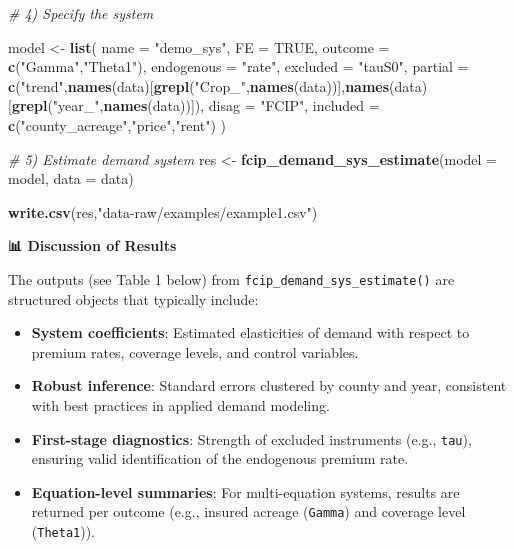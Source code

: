 \documentclass[
]{article}
\newenvironment{Shaded}{\begin{snugshade}}{\end{snugshade}}
\newcommand{\AttributeTok}[1]{\textcolor[rgb]{0.13,0.29,0.53}{#1}}
\newcommand{\CommentTok}[1]{\textcolor[rgb]{0.56,0.35,0.01}{\textit{#1}}}
\newcommand{\ConstantTok}[1]{\textcolor[rgb]{0.56,0.35,0.01}{#1}}
\newcommand{\FunctionTok}[1]{\textcolor[rgb]{0.13,0.29,0.53}{\textbf{#1}}}
\newcommand{\NormalTok}[1]{#1}
\newcommand{\OtherTok}[1]{\textcolor[rgb]{0.56,0.35,0.01}{#1}}
\newcommand{\StringTok}[1]{\textcolor[rgb]{0.31,0.60,0.02}{#1}}
\providecommand{\tightlist}{%
  \setlength{\itemsep}{0pt}\setlength{\parskip}{0pt}}
\begin{document}
\begin{Shaded}
\begin{Highlighting}[]
\CommentTok{\# 4) Specify the system}

\NormalTok{model }\OtherTok{\textless{}{-}} \FunctionTok{list}\NormalTok{(}
  \AttributeTok{name       =} \StringTok{"demo\_sys"}\NormalTok{,}
  \AttributeTok{FE         =} \ConstantTok{TRUE}\NormalTok{,}
  \AttributeTok{outcome    =} \FunctionTok{c}\NormalTok{(}\StringTok{"Gamma"}\NormalTok{,}\StringTok{"Theta1"}\NormalTok{),}
  \AttributeTok{endogenous =} \StringTok{"rate"}\NormalTok{,}
  \AttributeTok{excluded   =} \StringTok{"tauS0"}\NormalTok{,}
  \AttributeTok{partial    =} \FunctionTok{c}\NormalTok{(}\StringTok{"trend"}\NormalTok{,}\FunctionTok{names}\NormalTok{(data)[}\FunctionTok{grepl}\NormalTok{(}\StringTok{"Crop\_"}\NormalTok{,}\FunctionTok{names}\NormalTok{(data))],}\FunctionTok{names}\NormalTok{(data)[}\FunctionTok{grepl}\NormalTok{(}\StringTok{"year\_"}\NormalTok{,}\FunctionTok{names}\NormalTok{(data))]),}
  \AttributeTok{disag      =} \StringTok{"FCIP"}\NormalTok{,}
  \AttributeTok{included   =} \FunctionTok{c}\NormalTok{(}\StringTok{"county\_acreage"}\NormalTok{,}\StringTok{"price"}\NormalTok{,}\StringTok{"rent"}\NormalTok{)}
\NormalTok{)}

\CommentTok{\# 5) Estimate demand system}
\NormalTok{res }\OtherTok{\textless{}{-}} \FunctionTok{fcip\_demand\_sys\_estimate}\NormalTok{(}\AttributeTok{model =}\NormalTok{ model, }\AttributeTok{data =}\NormalTok{ data)}

\FunctionTok{write.csv}\NormalTok{(res,}\StringTok{"data{-}raw/examples/example1.csv"}\NormalTok{)}
\end{Highlighting}
\end{Shaded}

\textbf{📊 Discussion of Results}

The outputs (see Table 1 below) from
\texttt{fcip\_demand\_sys\_estimate()} are structured objects that
typically include:

\begin{itemize}
\tightlist
\item
  \textbf{System coefficients}: Estimated elasticities of demand with
  respect to premium rates, coverage levels, and control variables.\\
\item
  \textbf{Robust inference}: Standard errors clustered by county and
  year, consistent with best practices in applied demand modeling.\\
\item
  \textbf{First-stage diagnostics}: Strength of excluded instruments
  (e.g., \texttt{tau}), ensuring valid identification of the endogenous
  premium rate.\\
\item
  \textbf{Equation-level summaries}: For multi-equation systems, results
  are returned per outcome (e.g., insured acreage (\texttt{Gamma}) and
  coverage level (\texttt{Theta1})).
\end{itemize}
\end{document}

